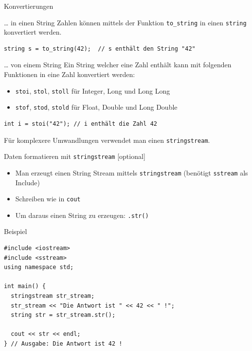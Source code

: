 \documentclass[presentation]{beamer}
\begin{document}
\begin{frame}[fragile,label={sec:org529e2b2}]{Konvertierungen}
 \begin{block}{\ldots{} in einen String}
Zahlen können mittels der Funktion {\color{solarizedYellow}\texttt{to\_string} }in einen {\color{solarizedYellow}\texttt{string}}
konvertiert werden.
\begin{verbatim}
string s = to_string(42);  // s enthält den String "42"
\end{verbatim}
\end{block}
\begin{block}{\ldots{} von einem String}
Ein String welcher eine Zahl enthält kann mit folgenden Funktionen in
eine Zahl konvertiert werden:
\begin{itemize}
\item {\color{solarizedYellow}\texttt{stoi}}, {\color{solarizedYellow}\texttt{stol}}, {\color{solarizedYellow}\texttt{stoll} }für Integer, Long und Long Long
\item {\color{solarizedYellow}\texttt{stof}}, {\color{solarizedYellow}\texttt{stod}}, {\color{solarizedYellow}\texttt{stold} }für Float, Double und Long Double
\end{itemize}
\begin{verbatim}
int i = stoi("42"); // i enthält die Zahl 42
\end{verbatim}
\end{block}
Für komplexere Umwandlungen verwendet man einen {\color{solarizedYellow}\texttt{stringstream}}.
\end{frame}
\begin{frame}[fragile,label={sec:org9eddb90}]{Daten formatieren mit {\color{solarizedYellow}\texttt{stringstream} }[optional]}
 \begin{itemize}
\item Man erzeugt einen \alert{String Stream} mittels {\color{solarizedYellow}\texttt{stringstream} }(benötigt
{\color{solarizedYellow}\texttt{sstream} }als Include)
\item Schreiben wie in {\color{solarizedYellow}\texttt{cout}}
\item Um daraus einen String zu erzeugen: {\color{solarizedYellow}\texttt{.str()}}
\end{itemize}
\begin{exampleblock}{Beispiel}
\begin{verbatim}
#include <iostream>
#include <sstream>
using namespace std;

int main() {
  stringstream str_stream;
  str_stream << "Die Antwort ist " << 42 << " !";
  string str = str_stream.str();

  cout << str << endl;
} // Ausgabe: Die Antwort ist 42 !
\end{verbatim}
\end{exampleblock}
\end{frame}
\end{document}
